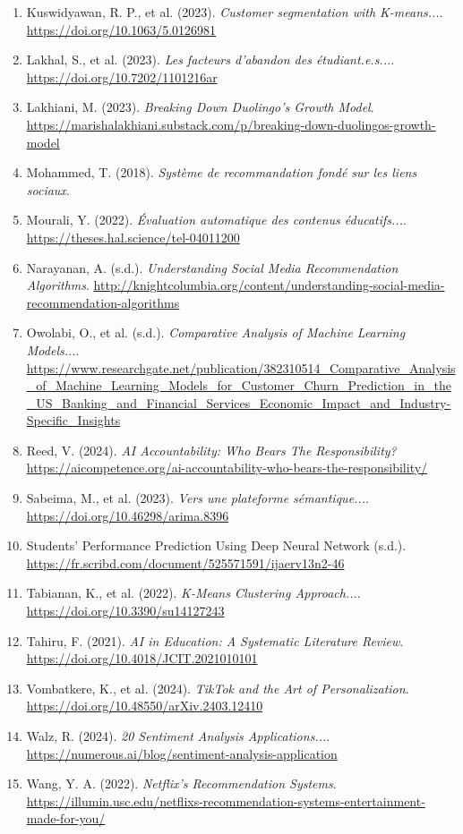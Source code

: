 \documentclass[12pt]{article}
\begin{document}
\begin{enumerate}
  \item Kuswidyawan, R. P., et al. (2023). \textit{Customer segmentation with K-means...}. \url{https://doi.org/10.1063/5.0126981}
  \item Lakhal, S., et al. (2023). \textit{Les facteurs d’abandon des étudiant.e.s...}. \url{https://doi.org/10.7202/1101216ar}
  \item Lakhiani, M. (2023). \textit{Breaking Down Duolingo’s Growth Model}. \url{https://marishalakhiani.substack.com/p/breaking-down-duolingos-growth-model}
  \item Mohammed, T. (2018). \textit{Système de recommandation fondé sur les liens sociaux}.
  \item Mourali, Y. (2022). \textit{Évaluation automatique des contenus éducatifs...}. \url{https://theses.hal.science/tel-04011200}
  \item Narayanan, A. (s.d.). \textit{Understanding Social Media Recommendation Algorithms}. \url{http://knightcolumbia.org/content/understanding-social-media-recommendation-algorithms}
  \item Owolabi, O., et al. (s.d.). \textit{Comparative Analysis of Machine Learning Models...}. \url{https://www.researchgate.net/publication/382310514_Comparative_Analysis_of_Machine_Learning_Models_for_Customer_Churn_Prediction_in_the_US_Banking_and_Financial_Services_Economic_Impact_and_Industry-Specific_Insights}
  \item Reed, V. (2024). \textit{AI Accountability: Who Bears The Responsibility?} \url{https://aicompetence.org/ai-accountability-who-bears-the-responsibility/}
  \item Sabeima, M., et al. (2023). \textit{Vers une plateforme sémantique...}. \url{https://doi.org/10.46298/arima.8396}
  \item Students’ Performance Prediction Using Deep Neural Network (s.d.). \url{https://fr.scribd.com/document/525571591/ijaerv13n2-46}
  \item Tabianan, K., et al. (2022). \textit{K-Means Clustering Approach...}. \url{https://doi.org/10.3390/su14127243}
  \item Tahiru, F. (2021). \textit{AI in Education: A Systematic Literature Review}. \url{https://doi.org/10.4018/JCIT.2021010101}
  \item Vombatkere, K., et al. (2024). \textit{TikTok and the Art of Personalization}. \url{https://doi.org/10.48550/arXiv.2403.12410}
  \item Walz, R. (2024). \textit{20 Sentiment Analysis Applications...}. \url{https://numerous.ai/blog/sentiment-analysis-application}
  \item Wang, Y. A. (2022). \textit{Netflix’s Recommendation Systems}. \url{https://illumin.usc.edu/netflixs-recommendation-systems-entertainment-made-for-you/}
\end{enumerate}
\end{document}

